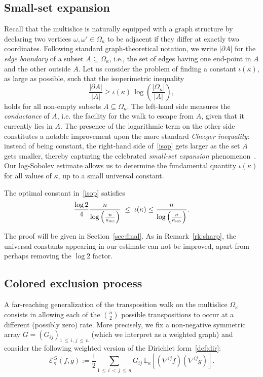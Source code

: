 \documentclass[10pt]{amsart}
\theoremstyle{definition}\newtheorem{defi}[theo]{Definition}\newtheorem{rema}[theo]{Remark}\newtheorem{exam}[theo]{Example}\newtheorem{exem}[theo]{Example}\newtheorem{nota}[theo]{Notation}
\newcommand{\EE}{\mathbb{E}}
\newcommand{\cE}{\mathcal{E}}
\newcommand{\am}{{\kappa_{\textsc{min}}}}
\begin{document}
\subsection{Small-set expansion}
Recall that the multislice is naturally equipped with a graph structure by declaring two vertices $\omega,\omega'\in\Omega_\kappa$ to be adjacent if they differ at exactly two coordinates. Following standard graph-theoretical notation, we write $|\partial A|$ for the \emph{edge boundary} of a subset $A\subseteq \Omega_\kappa$, i.e., the set of edges having one end-point in $A$ and the other outside $A$. Let us consider the problem of finding a constant $\iota(\kappa)$, as large as possible, such that the isoperimetric inequality
\begin{equation}\label{isop}
\frac{|\partial A|}{|A|} \ge \iota(\kappa)\,\log\left(\frac{|\Omega_\kappa|}{|A|}\right),
\end{equation}
holds for all non-empty subsets $A\subseteq \Omega_\kappa$. The left-hand side measures the \emph{conductance} of $A$, i.e. the facility for the walk to escape from $A$, given that it currently lies in $A$. The presence of the logarithmic term on the other side constitutes a notable improvement upon the more standard \emph{Cheeger inequality}: instead of being constant, the right-hand side of~\eqref{isop} gets larger as the set $A$ gets smaller, thereby capturing the celebrated \emph{small-set expansion} phenomenon~\cite{2018arXiv180903546F,21923,MR1798047}. Our log-Sobolev estimate allows us to determine the fundamental quantity $\iota(\kappa)$ for all values of $\kappa$, up to a small universal constant.

\begin{coro}\label{co:exp}
The optimal constant in~\eqref{isop} satisfies
\begin{equation}
\frac{\log 2}{4}\frac{n}{\log\left(\frac{n}{\am}\right)} \; \le \; \iota(\kappa) \le \frac{n}{\log\left(\frac{n}{\am}\right)}.
\end{equation}
\end{coro}

The proof will be given in Section~\ref{sec:final}. As in Remark~\ref{rk:sharp}, the universal constants appearing in our estimate can not be improved, apart from perhaps removing the $\log 2$ factor.

\subsection{Colored exclusion process}
A far-reaching generalization of the transposition walk on the multislice $\Omega_\kappa$ consists in allowing each of the $\binom{n}{2}$ possible transpositions to occur at a different (possibly zero) rate. More precisely, we fix a non-negative symmetric array $G=(G_{ij})_{1\,\le\,i,\,j\,\le\,n}$ (which we interpret as a weighted graph) and consider the following weighted version of the Dirichlet form~\eqref{def:dir}:
\begin{equation}\label{def:weighted}
\cE_{\kappa}^G\left(f,g\right) := \frac{1}{2}\sum_{1\,\le\,i\,<\,j\,\le\,n}G_{ij}\,\EE_\kappa\left[\left(\nabla^{ij}f\right)\left(\nabla^{ij}g\right)\right].
\end{equation}
\end{document}
